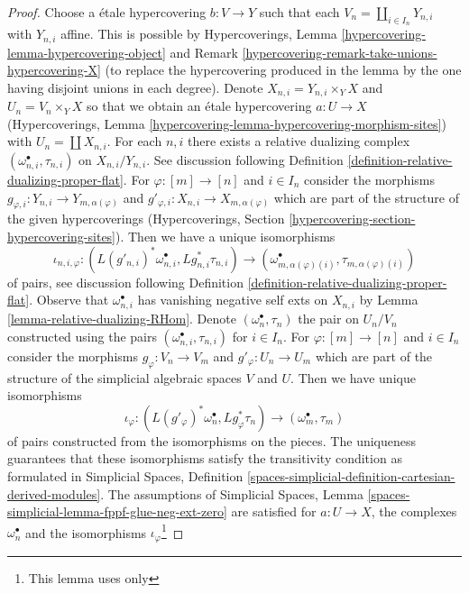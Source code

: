 \documentclass[10pt,a4paper]{amsart}
\theoremstyle{plain}
\theoremstyle{definition}
\theoremstyle{remark}
\numberwithin{equation}{subsection}
\begin{document}
\begin{proof}
Choose a \'etale hypercovering $b : V \to Y$ such that each
$V_n = \coprod_{i \in I_n} Y_{n, i}$ with $Y_{n, i}$ affine.
This is possible by Hypercoverings, Lemma
\ref{hypercovering-lemma-hypercovering-object} and
Remark \ref{hypercovering-remark-take-unions-hypercovering-X}
(to replace the hypercovering produced
in the lemma by the one having disjoint unions in each degree).
Denote $X_{n, i} = Y_{n, i} \times_Y X$ and $U_n = V_n \times_Y X$
so that we obtain an \'etale hypercovering
$a : U \to X$ (Hypercoverings, Lemma
\ref{hypercovering-lemma-hypercovering-morphism-sites})
with $U_n = \coprod X_{n, i}$.
For each $n, i$ there exists a relative dualizing complex
$(\omega_{n, i}^\bullet, \tau_{n, i})$ on $X_{n, i}/Y_{n, i}$.
See discussion following
Definition \ref{definition-relative-dualizing-proper-flat}.
For $\varphi : [m] \to [n]$ and $i \in I_n$ consider the morphisms
$g_{\varphi, i} : Y_{n, i} \to Y_{m, \alpha(\varphi)}$ and
$g'_{\varphi, i} : X_{n, i} \to X_{m, \alpha(\varphi)}$
which are part of the structure of the given hypercoverings
(Hypercoverings, Section \ref{hypercovering-section-hypercovering-sites}).
Then we have a unique isomorphisms
$$
\iota_{n, i, \varphi} :
(L(g'_{n, i})^*\omega_{n, i}^\bullet, Lg_{n, i}^*\tau_{n, i})
\longrightarrow
(\omega_{m, \alpha(\varphi)(i)}^\bullet, \tau_{m, \alpha(\varphi)(i)})
$$
of pairs, see discussion following
Definition \ref{definition-relative-dualizing-proper-flat}.
Observe that $\omega_{n, i}^\bullet$ has vanishing negative
self exts on $X_{n, i}$ by Lemma \ref{lemma-relative-dualizing-RHom}.
Denote $(\omega_n^\bullet, \tau_n)$ the pair on $U_n/V_n$ constructed using
the pairs $(\omega_{n, i}^\bullet, \tau_{n, i})$ for $i \in I_n$.
For $\varphi : [m] \to [n]$ and $i \in I_n$ consider the morphisms
$g_\varphi : V_n \to V_m$ and $g'_\varphi : U_n \to U_m$ which are part
of the structure of the simplicial algebraic spaces $V$ and $U$.
Then we have unique isomorphisms
$$
\iota_\varphi :
(L(g'_\varphi)^*\omega_n^\bullet, Lg_\varphi^*\tau_n)
\longrightarrow
(\omega_m^\bullet, \tau_m)
$$
of pairs constructed from the isomorphisms on the pieces.
The uniqueness guarantees that these isomorphisms satisfy
the transitivity condition as formulated in
Simplicial Spaces, Definition
\ref{spaces-simplicial-definition-cartesian-derived-modules}.
The assumptions of Simplicial Spaces, Lemma
\ref{spaces-simplicial-lemma-fppf-glue-neg-ext-zero}
are satisfied for $a : U \to X$, the complexes $\omega_n^\bullet$
and the isomorphisms $\iota_\varphi$\footnote{This lemma uses only
}
\end{proof}
\end{document}
